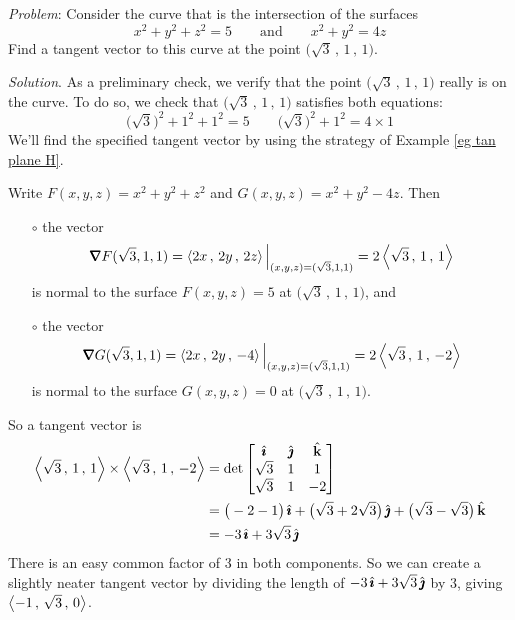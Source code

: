 \begin{eg}\label{eg tan plane I}
\noindent\textit{Problem}:
Consider the curve that is the intersection of the surfaces
\begin{equation*}
x^2+y^2+z^2=5\qquad\text{and}\qquad
x^2+y^2=4z
\end{equation*}
Find a tangent vector to this curve 
at the point $\big(\sqrt{3}\,,\,1\,,\,1\big)$.

\medskip
\noindent\textit{Solution}.
As a preliminary check, we verify that the point $\big(\sqrt{3}\,,\,1\,,\,1\big)$ really is on the curve. To do so,
we check that $\big(\sqrt{3}\,,\,1\,,\,1\big)$ satisfies both equations:
\begin{equation*}
\big(\sqrt{3}\big)^2+1^2+1^2=5\qquad
\big(\sqrt{3}\big)^2+1^2=4\times 1
\end{equation*}
We'll find the specified tangent vector by using the strategy of 
Example \ref{eg tan plane H}. 

Write $F(x,y,z) = x^2+y^2+z^2$
and $G(x,y,z) = x^2+y^2-4z$. Then
\begin{itemize}\itemsep1pt \parskip0pt  %
\item[$\circ$] 
the vector 
\begin{equation*}
\vnabla F(\sqrt{3},1,1)
 =\llt 2x\,,\,2y\,,\,2z \rgt\Big|_{(x,y,z)=(\sqrt{3},1,1)}
 = 2\llt \sqrt{3}\,,\,1\,,\,1 \rgt
\end{equation*} 
is normal to the surface $F(x,y,z)=5$ at $\big(\sqrt{3}\,,\,1\,,\,1\big)$,
and
\item[$\circ$] 
the vector 
\begin{equation*}
\vnabla G(\sqrt{3},1,1)
 =\llt 2x\,,\,2y\,,\,-4 \rgt\Big|_{(x,y,z)=(\sqrt{3},1,1)}
 = 2\llt \sqrt{3}\,,\,1\,,\,-2 \rgt
\end{equation*} 
is normal to the surface $G(x,y,z)=0$ at $\big(\sqrt{3}\,,\,1\,,\,1\big)$.
\end{itemize}
So a tangent vector is
\begin{align*}
\left< \sqrt{3}\,,\,1\,,\,1 \right>\times \left< \sqrt{3}\,,\,1\,,\,-2 \right>
    &=\det\left[\begin{matrix}
                 \hat{\pmb{\imath}} & \hat{\pmb{\jmath}} & \hat{\mathbf{k}} \\
            \sqrt{3} &  1  & 1 \\
            \sqrt{3} &  1  & -2 \end{matrix}\right] \\
& =\big(-2-1\big)\,\hat{\pmb{\imath}} + \big(\sqrt{3}+2\sqrt{3}\big)\,\hat{\pmb{\jmath}}
    +\big(\sqrt{3}-\sqrt{3}\big)\,\hat{\mathbf{k}} \\
&= -3\,\hat{\pmb{\imath}} + 3\sqrt{3}\,\hat{\pmb{\jmath}}
\end{align*}
There is an easy common factor of $3$ in both components. So
we can create a slightly neater tangent vector by dividing the length 
of $-3\,\hat{\pmb{\imath}} + 3\sqrt{3}\,\hat{\pmb{\jmath}}$ by $3$, giving  $\left< -1\,,\,\sqrt{3}\,,\,0\right>$.
\end{eg}

